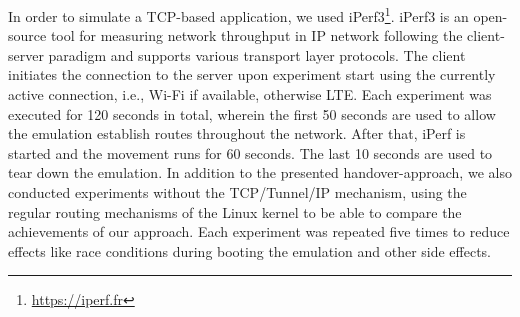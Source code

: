In order to simulate a TCP-based application, we used iPerf3\footnote{\url{https://iperf.fr}}.
iPerf3 is an open-source tool for measuring network throughput in IP network following the client-server paradigm and supports various transport layer protocols.
The client initiates the connection to the server upon experiment start using the currently active connection, i.e., Wi-Fi if available, otherwise LTE.
Each experiment was executed for 120 seconds in total, wherein the first 50 seconds are used to allow the emulation establish routes throughout the network.%
After that, iPerf is started and the movement runs for 60 seconds.
The last 10 seconds are used to tear down the emulation.
In addition to the presented handover-approach, we also conducted experiments without the TCP/Tunnel/IP mechanism, using the regular routing mechanisms of the Linux kernel to be able to compare the achievements of our approach.
Each experiment was repeated five times to reduce effects like race conditions during booting the emulation and other side effects.



